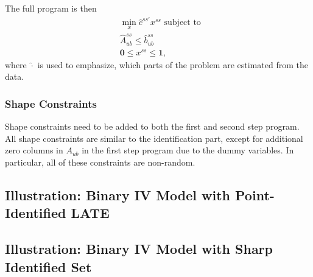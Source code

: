 \documentclass[12pt,a4paper,english]{article} %
\numberwithin{equation}{section}
\theoremstyle{definition}
\theoremstyle{remark}
\theoremstyle{plain}
\begin{document}
The full program is then
\begin{align}
  & \min_x \hat{c}^{ss'}x^{ss} \text{ subject to }\\
  & \hat{A}_{ub}^{ss} \leq \hat{b}_{ub}^{ss} \\
  & \mathbf{0} \leq x^{ss} \leq \mathbf{1},
\end{align}
where $\hat{\cdot}$ is used to emphasize, which parts of the problem are estimated from the data.

\subsubsection{Shape Constraints}
Shape constraints need to be added to both the first and second step program.
All shape constraints are similar to the identification part, except for additional zero columns in $A_{ub}$ in the first step program due to the dummy variables.
In particular, all of these constraints are non-random.


\subsection{Illustration: Binary IV Model with Point-Identified LATE}


\subsection{Illustration: Binary IV Model with Sharp Identified Set}
\end{document}
